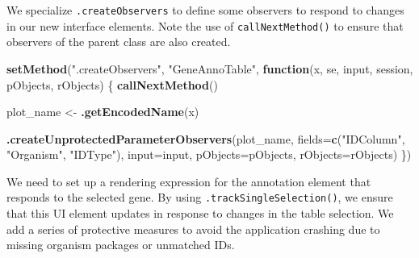 \documentclass[
]{book}
\newenvironment{Shaded}{\begin{snugshade}}{\end{snugshade}}
\newcommand{\ControlFlowTok}[1]{\textcolor[rgb]{0.13,0.29,0.53}{\textbf{#1}}}
\newcommand{\DataTypeTok}[1]{\textcolor[rgb]{0.13,0.29,0.53}{#1}}
\newcommand{\KeywordTok}[1]{\textcolor[rgb]{0.13,0.29,0.53}{\textbf{#1}}}
\newcommand{\NormalTok}[1]{#1}
\newcommand{\StringTok}[1]{\textcolor[rgb]{0.31,0.60,0.02}{#1}}
\begin{document}
We specialize \texttt{.createObservers} to define some observers to respond to changes in our new interface elements.
Note the use of \texttt{callNextMethod()} to ensure that observers of the parent class are also created.

\begin{Shaded}
\begin{Highlighting}[]
\KeywordTok{setMethod}\NormalTok{(}\StringTok{".createObservers"}\NormalTok{, }\StringTok{"GeneAnnoTable"}\NormalTok{,}
    \ControlFlowTok{function}\NormalTok{(x, se, input, session, pObjects, rObjects)}
\NormalTok{\{}
    \KeywordTok{callNextMethod}\NormalTok{()}

\NormalTok{    plot_name <-}\StringTok{ }\KeywordTok{.getEncodedName}\NormalTok{(x)}

    \KeywordTok{.createUnprotectedParameterObservers}\NormalTok{(plot_name,}
        \DataTypeTok{fields=}\KeywordTok{c}\NormalTok{(}\StringTok{"IDColumn"}\NormalTok{, }\StringTok{"Organism"}\NormalTok{, }\StringTok{"IDType"}\NormalTok{), }
        \DataTypeTok{input=}\NormalTok{input, }\DataTypeTok{pObjects=}\NormalTok{pObjects, }\DataTypeTok{rObjects=}\NormalTok{rObjects)}
\NormalTok{\})}
\end{Highlighting}
\end{Shaded}

We need to set up a rendering expression for the annotation element that responds to the selected gene.
By using \texttt{.trackSingleSelection()}, we ensure that this UI element updates in response to changes in the table selection.
We add a series of protective measures to avoid the application crashing due to missing organism packages or unmatched IDs.
\end{document}
